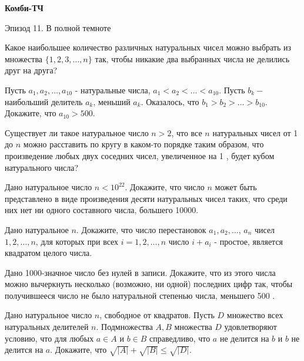 \centerline{\bf \Huge Комби-ТЧ}

\begin{flushright}
        \scriptsize{Эпизод 11. В полной темноте}
\end{flushright}

Какое наибольшее количество различных натуральных чисел можно выбрать из множества $\{1,2,3, \ldots, n\}$ так, чтобы никакие два выбранных числа не делились друг на друга?

Пусть $a_1, a_2, \ldots, a_{10}$ - натуральные числа, $a_1<a_2<\ldots<a_{10}$. Пусть $b_k-$ наибольший делитель $a_k$, меньший $a_k$. Оказалось, что $b_1>b_2>\ldots>b_{10}$. Докажите, что $a_{10}>500$.

Существует ли такое натуральное число $n>2$, что все $n$ натуральных чисел от 1 до $n$ можно расставить по кругу в каком-то порядке таким образом, что произведение любых двух соседних чисел, увеличенное на 1 , будет кубом натурального числа?

Дано натуральное число $n<10^{22}$. Докажите, что число $n$ может быть представлено в виде произведения десяти натуральных чисел таких, что среди них нет ни одного составного числа, большего 10000.

Дано натуральное $n$. Докажите, что число перестановок $a_1, a_2, \ldots$, $a_n$ чисел $1,2, \ldots, n$, для которых при всех $i=1,2, \ldots, n$ число $i+a_i$ - простое, является квадратом целого числа.

Дано 1000-значное число без нулей в записи. Докажите, что из этого числа можно вычеркнуть несколько (возможно, ни одной) последних цифр так, чтобы получившееся число не было натуральной степенью числа, меньшего 500 .

Дано натуральное число $n$, свободное от квадратов. Пусть $D$ множество всех натуральных делителей $n$. Подмножества $A, B$ множества $D$ удовлетворяют условию, что для любых $a \in A$ и $b \in B$ справедливо, что $a$ не делится на $b$ и $b$ не делится на $a$. Докажите, что $\sqrt{|A|}+\sqrt{|B|} \leqslant \sqrt{|D|}$.